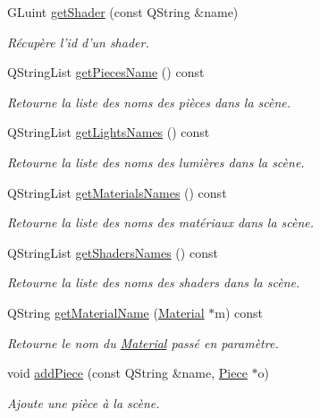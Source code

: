 \begin{DoxyCompactItemize}
G\+Luint \hyperlink{class_scene_a002dee3b17da628be382679c99d78c8f}{get\+Shader} (const Q\+String \&name)
\begin{DoxyCompactList}\small\item\em Récupère l'id d'un shader. \end{DoxyCompactList}\item 
Q\+String\+List \hyperlink{class_scene_a2ea5207a5d9ec6e4081f12896b01d9d5}{get\+Pieces\+Name} () const 
\begin{DoxyCompactList}\small\item\em Retourne la liste des noms des pièces dans la scène. \end{DoxyCompactList}\item 
Q\+String\+List \hyperlink{class_scene_a215d616b6132f30a6bfc66ea4a3cfb95}{get\+Lights\+Names} () const 
\begin{DoxyCompactList}\small\item\em Retourne la liste des noms des lumières dans la scène. \end{DoxyCompactList}\item 
Q\+String\+List \hyperlink{class_scene_a481bf791889936bf3521c849bc4c7c2f}{get\+Materials\+Names} () const 
\begin{DoxyCompactList}\small\item\em Retourne la liste des noms des matériaux dans la scène. \end{DoxyCompactList}\item 
Q\+String\+List \hyperlink{class_scene_ae8045c3444b367c070988b30d69e5a36}{get\+Shaders\+Names} () const 
\begin{DoxyCompactList}\small\item\em Retourne la liste des noms des shaders dans la scène. \end{DoxyCompactList}\item 
Q\+String \hyperlink{class_scene_accd8407f070358c3d6744994df93a92d}{get\+Material\+Name} (\hyperlink{class_material}{Material} $\ast$m) const 
\begin{DoxyCompactList}\small\item\em Retourne le nom du \hyperlink{class_material}{Material} passé en paramètre. \end{DoxyCompactList}\item 
void \hyperlink{class_scene_a6c40a38ef472e73ddee697f813b8e587}{add\+Piece} (const Q\+String \&name, \hyperlink{class_piece}{Piece} $\ast$o)
\begin{DoxyCompactList}\small\item\em Ajoute une pièce à la scène. \end{DoxyCompactList}\item 

\end{DoxyCompactItemize}
